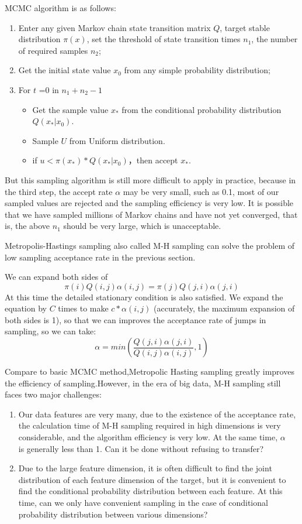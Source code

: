 MCMC  algorithm is as follows:
\begin{enumerate}
  \item Enter any given Markov chain state transition matrix $Q$, target stable distribution $\pi(x)$, set the threshold of state transition times $n_1$, the number of required samples $n_2$;
  \item Get the initial state value $x_0$ from any simple probability distribution;
  \item For $t$ =0 in $n_1+n_2-1$
    \begin{itemize}
      \item Get the sample value $x_*$ from the conditional probability distribution $Q(x_*|x_0)$.
      \item Sample $U$ from Uniform distribution.
      \item if $u<\pi(x_*)*Q(x_*|x_0)$，then accept $x_*$.
    \end{itemize}
\end{enumerate}


But this sampling algorithm is still more difficult to apply in practice, because in the third step, the accept rate $\alpha$ may be very small, such as 0.1, most of our sampled values ​​are rejected and the sampling efficiency is very low. It is possible that we have sampled millions of Markov chains and have not yet converged, that is, the above $n_1$ should be  very large, which is unacceptable.

Metropolis-Hastings sampling also called M-H sampling can solve the problem of low  sampling acceptance rate in the previous section.

We can expand both sides of
\[
  \pi(i)Q(i,j)\alpha(i,j) =  \pi(j)Q(j,i)\alpha(j,i)
\]
At this time the detailed stationary condition is also satisfied. We expand the equation by $C$ times to make $c*\alpha(i,j)$ (accurately, the maximum expansion of both sides is 1), so that we can improves the acceptance rate of jumps in sampling, so we can take:
\[
  \alpha = min(\frac{Q(j,i)\alpha(j,i)}{Q(i,j)\alpha(i,j)},1)
\]

Compare to basic MCMC method,Metropolic Hasting sampling  greatly improves the efficiency of sampling.However, in the era of big data, M-H sampling still faces two major challenges:
\begin{enumerate}

  \item Our data features are very many, due to the existence of the acceptance rate, the calculation time of M-H sampling required in high dimensions is very considerable, and the algorithm efficiency is very low. At the same time, $ \alpha $　is generally less than 1.  Can it be done without refusing to transfer?

  \item Due to the large feature dimension, it is often difficult to find the joint distribution of each feature dimension of the target, but it is convenient to find the conditional probability distribution between each feature. At this time, can we only have convenient sampling in the case of conditional probability distribution between various dimensions?
\end{enumerate}

